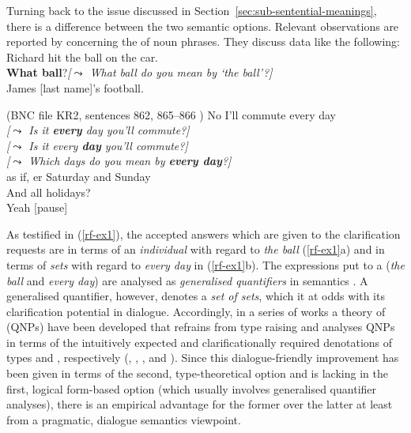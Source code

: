 \documentclass[output=paper]{langsci/langscibook}
\begin{document}
Turning back to the issue discussed in Section~\ref{sec:sub-sentential-meanings}, there is a difference between the two semantic options.
%
Relevant observations are reported by \citet{Purver:Ginzburg:2004} concerning the  of noun phrases.
%
They discuss data like the following:
%
\ea \label{rf-ex1}
  \ea  {} Richard hit the ball on the car. \\
 \textbf{What ball}?\hspace*{0.25cm}\emph{[$\leadsto$ What ball do you mean by  `the ball'?]} \\
 James [last name]'s football. \par\smallskip
\hfill (BNC file KR2, sentences 862, 865--866 )
  \ex {} No I'll commute every day \\
 \emph{[$\leadsto$ Is it \textbf{every} day you'll commute?]}\\
 \emph{[$\leadsto$ Is it every \textbf{day} you'll commute?]}\\
 \emph{[$\leadsto$ Which days do you mean by \textbf{every day}?]}\\
 as if, er Saturday and Sunday \\
 And all holidays? \\
 Yeah [pause]
  \z
\z

As testified in (\ref{rf-ex1}), the accepted answers which are given to the clarification requests are in terms of an \emph{individual} with regard to \textit{the ball} (\ref{rf-ex1}a) and in terms of \emph{sets} with regard to \textit{every day} in (\ref{rf-ex1}b).
%
The expressions put to a  (\textit{the ball} and \textit{every day}) are analysed as \emph{generalised quantifiers}  in semantics \citep{montague73}.
%
A generalised quantifier, however, denotes a \emph{set of sets}, which it at odds with its clarification potential in dialogue. 
%
Accordingly, in a series of works a theory of  (QNPs) have been developed that refrains from type raising and analyses QNPs in terms of the intuitively expected and clarificationally required denotations of types  and , respectively  (\citet{Purver:Ginzburg:2004},  \citet{Ginzburg:Purver:2012}, \citet{Ginzburg:2012}, \citet{Luecking:Ginzburg:2018} and \citet{Cooper:ms}). 
%
Since this dialogue-friendly improvement has been given in terms of the second, type-theoretical option and is lacking in the first, logical form-based option (which usually involves generalised quantifier analyses), there is an empirical advantage for the former over the latter at least from a pragmatic, dialogue semantics viewpoint.
\end{document}
